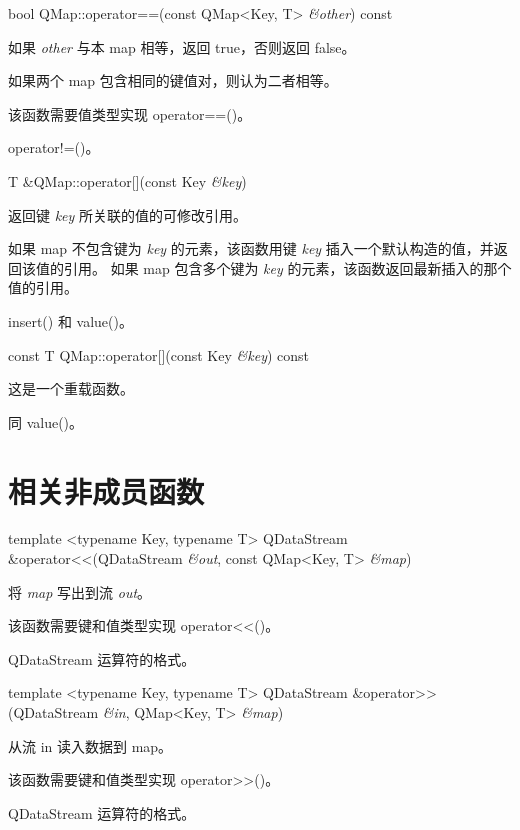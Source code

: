 \splitLine

bool QMap::operator==(const QMap<Key, T> \emph{\&other}) const

如果 \emph{other} 与本 map 相等，返回 true，否则返回 false。

如果两个 map 包含相同的键值对，则认为二者相等。

该函数需要值类型实现 operator==()。

\begin{seeAlso}
operator!=()。
\end{seeAlso}

\splitLine

T \&QMap::operator[](const Key \emph{\&key})

返回键 \emph{key} 所关联的值的可修改引用。

如果 map 不包含键为 \emph{key} 的元素，该函数用键 \emph{key} 插入一个默认构造的值，并返回该值的引用。
如果 map 包含多个键为  \emph{key} 的元素，该函数返回最新插入的那个值的引用。

\begin{seeAlso}
insert() 和 value()。
\end{seeAlso}

\splitLine

const T QMap::operator[](const Key \emph{\&key}) const

这是一个重载函数。

同 value()。

\section{相关非成员函数}

template <typename Key, typename T> QDataStream \&operator<<(QDataStream \emph{\&out}, const QMap<Key, T> \emph{\&map})

将 \emph{map} 写出到流 \emph{out}。

该函数需要键和值类型实现 operator<<()。

\begin{seeAlso}
QDataStream 运算符的格式。
\end{seeAlso}

\splitLine

template <typename Key, typename T> QDataStream \&operator>>(QDataStream \emph{\&in}, QMap<Key, T> \emph{\&map})

从流 in 读入数据到 map。

该函数需要键和值类型实现 operator>>()。

\begin{seeAlso}
QDataStream 运算符的格式。
\end{seeAlso}